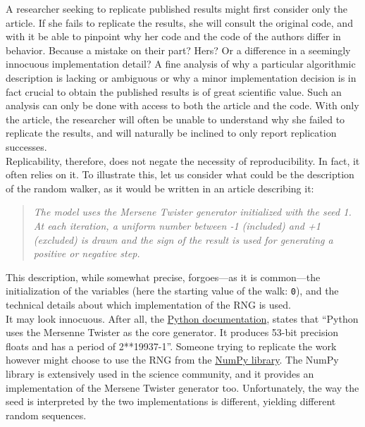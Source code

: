 \documentclass[a4paper,11pt]{article}
\begin{document}
A researcher seeking to replicate published results might first consider only the article. If she fails to replicate the results, she will consult the original code, and with it be able to pinpoint why her code and the code of the authors differ in behavior. Because a mistake on their part? Hers? Or a difference in a seemingly innocuous implementation detail? A fine analysis of why a particular algorithmic description is lacking or ambiguous or why a minor implementation decision is in fact crucial to obtain the published results is of great scientific value. Such an analysis can only be done with access to both the article and the code. With only the article, the researcher will often be unable to understand why she failed to replicate the results, and will naturally be inclined to only report replication successes.\\

Replicability, therefore, does not negate the necessity of reproducibility. In fact, it often relies on it. To illustrate this, let us consider what could be the description of the random walker, as it would be written in an article describing it:
%
\begin{quotation}
{\em The model uses the Mersene Twister generator initialized with the seed 1. At each iteration, a uniform number between -1 (included) and +1 (excluded) is drawn and the sign of the result is used for generating a positive or negative step.}
\end{quotation}
%
This description, while somewhat precise, forgoes---as it is common---the initialization of the variables (here the starting value of the walk: {\tt 0}), and the technical details about which implementation of the RNG is used.\\



It may look innocuous. After all, the
\href{https://docs.python.org/3.6/library/random.html}{Python documentation},
states that \enquote{Python uses the Mersenne Twister as the core generator. It produces
53-bit precision floats and has a period of 2**19937-1}. Someone trying to replicate the work however might choose to use the RNG from the \href{http://www.numpy.org/}{NumPy library}.  The NumPy library is extensively used in the science community, and it provides an implementation of the Mersene Twister generator too. Unfortunately, the way the seed is interpreted by the two implementations is different, yielding different random sequences.\\
\end{document}
